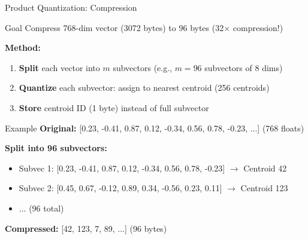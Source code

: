 \documentclass[aspectratio=169]{beamer}
\begin{document}
\begin{frame}[shrink=10]{Product Quantization: Compression}
\begin{block}{Goal}
Compress 768-dim vector (3072 bytes) to 96 bytes (32$\times$ compression!)
\end{block}

\vspace{1em}

\textbf{Method:}
\begin{enumerate}
    \item \textbf{Split} each vector into $m$ subvectors (e.g., $m=96$ subvectors of 8 dims)
    \item \textbf{Quantize} each subvector: assign to nearest centroid (256 centroids)
    \item \textbf{Store} centroid ID (1 byte) instead of full subvector
\end{enumerate}

\vspace{1em}

\begin{exampleblock}{Example}
\textbf{Original:} [0.23, -0.41, 0.87, 0.12, -0.34, 0.56, 0.78, -0.23, ...] (768 floats)

\textbf{Split into 96 subvectors:}
\begin{itemize}
    \item Subvec 1: [0.23, -0.41, 0.87, 0.12, -0.34, 0.56, 0.78, -0.23] $\rightarrow$ Centroid 42
    \item Subvec 2: [0.45, 0.67, -0.12, 0.89, 0.34, -0.56, 0.23, 0.11] $\rightarrow$ Centroid 123
    \item ... (96 total)
\end{itemize}

\textbf{Compressed:} [42, 123, 7, 89, ...] (96 bytes)
\end{exampleblock}
\end{frame}
\end{document}
